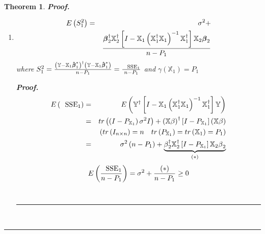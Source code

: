 \documentclass{article}
\newtheorem{theorem}{Theorem}
\newenvironment{proof}[1][Proof]{\noindent\textbf{#1.} }{\ \rule{0.5em}{0.5em}}
\begin{document}
\begin{theorem}
\begin{proof}
\begin{enumerate}
\begin{eqnarray*}
&\therefore &Var\left( \boldsymbol{\hat{\beta}}_{1}\right) -Var\left( 
\boldsymbol{\hat{\beta}}_{1}^{\ast }\right) =\sigma ^{2}\left[ \left( 
\mathbb{X}_{1}^{\dagger }\mathbb{X}\right) ^{-1}+\mathbb{A}B^{-1}\mathbb{A}%
^{\dagger }\right] \\
&&-\sigma ^{2}\left( \mathbb{X}_{1}^{\dagger }\mathbb{X}\right) ^{-1} \\
&=&\sigma ^{2}\underset{\text{P.D. why?}}{\fbox{$\mathbb{AB}^{-1}\mathbb{A}%
^{\dagger }$}}
\end{eqnarray*}

\item 
\begin{eqnarray*}
E\left( S_{1}^{2}\right) &=&\sigma ^{2}+ \\
&&\frac{\boldsymbol{\beta }_{2}^{\dagger }\mathbb{X}_{2}^{\dagger }\left[ I-%
\mathbb{X}_{1}\left( \mathbb{X}_{1}^{\dagger }\mathbb{X}_{1}\right) ^{-1}%
\mathbb{X}_{1}^{\dagger }\right] \mathbb{X}_{2}\boldsymbol{\beta }_{2}}{%
n-P_{1}}
\end{eqnarray*}%
where $S_{1}^{2}=\frac{\left( \mathbb{Y}-\mathbb{X}_{1}\boldsymbol{\hat{\beta%
}}_{1}^{\ast }\right) ^{\dagger }\left( \mathbb{Y}-\mathbb{X}_{1}\boldsymbol{%
\hat{\beta}}_{1}^{\ast }\right) }{n-P_{1}}=\frac{\text{SSE}_{1}}{n-P_{1}}$
and $\gamma \left( \mathbb{X}_{1}\right) =P_{1}$

\begin{proof}
\begin{eqnarray*}
E\left( \text{SSE}_{1}\right) &=&E\left( \mathbb{Y}^{\dagger }\left[ I-%
\mathbb{X}_{1}\left( \mathbb{X}_{1}^{\dagger }\mathbb{X}_{1}\right) ^{-1}%
\mathbb{X}_{1}^{\dagger }\right] \mathbb{Y}\right) \\
&=&tr\left( \left( I-P_{\mathbb{X}_{1}}\right) \sigma ^{2}I\right) +\left( 
\mathbb{X}\beta \right) ^{\dagger }\left[ I-P_{\mathbb{X}_{1}}\right] \left( 
\mathbb{X}\beta \right) \\
&&\left( tr\left( I_{n\times n}\right) =n\quad tr\left( P_{\mathbb{X}%
_{1}}\right) =tr\left( \mathbb{X}_{1}\right) =P_{1}\right) \\
&=&\sigma ^{2}\left( n-P_{1}\right) +\underset{\left( \ast \right) }{%
\underbrace{\beta _{2}^{\dagger }\mathbb{X}_{2}^{\dagger }\left[ I-P_{%
\mathbb{X}_{1}}\right] \mathbb{X}_{2}\beta _{2}}}
\end{eqnarray*}%
\begin{equation*}
\therefore E\left( \frac{\text{SSE}_{1}}{n-P_{1}}\right) =\sigma ^{2}+\frac{%
\left( \ast \right) }{n-P_{1}}\geq 0
\end{equation*}
\end{proof}
\end{enumerate}
\end{proof}
\end{theorem}
\end{document}

